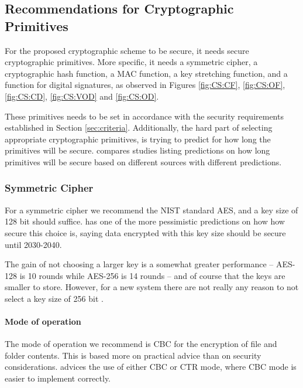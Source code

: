\documentclass[pdftex,english,10pt,b5paper,twoside]{book}
\begin{document}
\subsection{Recommendations for Cryptographic Primitives}
\label{sec:cryptoprimitivechoice}

For the proposed cryptographic scheme to be secure, it needs secure
cryptographic primitives. More specific, it needs a symmetric cipher, a
cryptographic hash function, a \ac{MAC} function, a key stretching function,
and a function for digital signatures, as observed in Figures \ref{fig:CS:CF},
\ref{fig:CS:OF}, \ref{fig:CS:CD}, \ref{fig:CS:VOD} and \ref{fig:CS:OD}.

These primitives needs to be set in accordance with the security requirements
established in Section \ref{sec:criteria}. Additionally, the hard part of
selecting appropriate cryptographic primitives, is trying to predict for how
long the primitives will be secure. \citet{keylength} compares studies listing
predictions on how long primitives will be secure based on different sources
with different predictions.

\subsubsection{Symmetric Cipher}

For a symmetric cipher we recommend the \ac{NIST} standard \ac{AES}, and a key
size of 128 bit should suffice.  \cite{ecrypt2_2010}
has one of the more pessimistic predictions on how how secure this choice is,
saying data encrypted with this key size should be secure until 2030-2040.

The gain of not choosing a larger key is a somewhat greater performance --
\ac{AES}-128 is 10 rounds while \ac{AES}-256 is 14 rounds -- and of course that
the keys are smaller to store. However, for a new system there are not really
any reason to not select a key size of 256 bit \cite{schneier}.

\paragraph{Mode of operation} The mode of operation we recommend is \ac{CBC}
for the encryption of file and folder contents.  This is based more on
practical advice than on security considerations.  \citet{schneier} advices the
use of either \ac{CBC} or \ac{CTR} mode, where \ac{CBC} mode is easier to
implement correctly.
\end{document}
